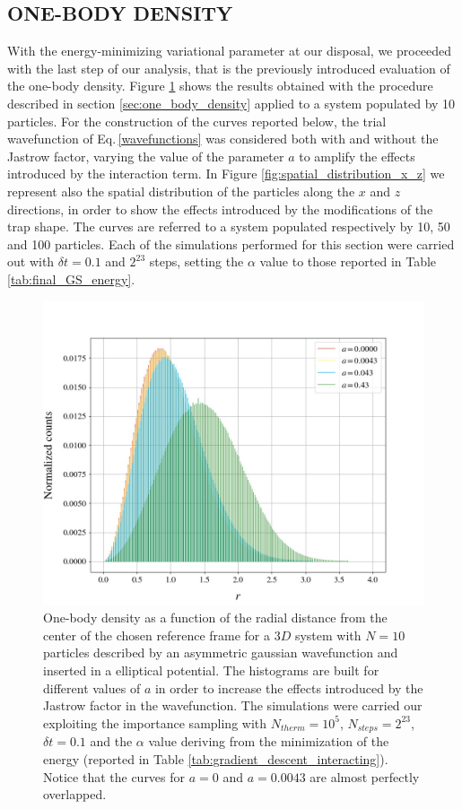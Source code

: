 \subsection{ONE-BODY DENSITY}
With the energy-minimizing variational parameter at our disposal, we proceeded with the last step of our analysis, that is the previously introduced evaluation of the one-body density. Figure \ref{fig:one_body_density_histogram} shows the results obtained with the procedure described in section \ref{sec:one_body_density} applied to a system populated by 10 particles. For the construction of the curves reported below, the trial wavefunction of Eq.\,\ref{wavefunctions} was considered both with and without the Jastrow factor, varying the value of the parameter $a$ to amplify the effects introduced by the interaction term. In Figure \ref{fig:spatial_distribution_x_z} we represent also the spatial distribution of the particles along the $x$ and $z$ directions, in order to show the effects introduced by the modifications of the trap shape. The curves are referred to a system populated respectively by 10, 50 and 100 particles. Each of the simulations performed for this section were carried out with $\delta t = 0.1$ and $2^{23}$ steps, setting the $\alpha$ value to those reported in Table \ref{tab:final_GS_energy}.


\begin{figure}[H]
    \includegraphics[scale=0.37]{images/onebody_density.jpg}
    \caption{One-body density as a function of the radial distance from the center of the chosen reference frame for a $3D$ system with $N=10$ particles described by an asymmetric gaussian wavefunction and inserted in a elliptical potential. The histograms are built for different values of $a$ in order to increase the effects introduced by the Jastrow factor in the wavefunction. The simulations were carried our exploiting the importance sampling with $N_{therm}=10^5$, $N_{steps}=2^{23}$, $\delta t =0.1$ and the $\alpha$ value deriving from the minimization of the energy (reported in Table \ref{tab:gradient_descent_interacting}). Notice that the curves for $a=0$ and $a=0.0043$ are almost perfectly overlapped. }
    \label{fig:one_body_density_histogram}
\end{figure}

